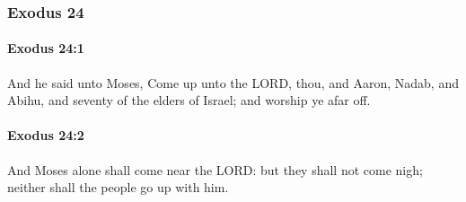 	\subsubsection{Exodus 24} %
		\label{EXODUS-24}

		\paragraph{Exodus 24:1} %
			\label{EXODUS-24-1}

			And he said unto Moses, Come up unto the LORD, thou, and Aaron, Nadab, and Abihu, and seventy of the elders of Israel; and worship ye afar off.


		\paragraph{Exodus 24:2} %
			\label{EXODUS-24-2}

			And Moses alone shall come near the LORD: but they shall not come nigh; neither shall the people go up with him.

